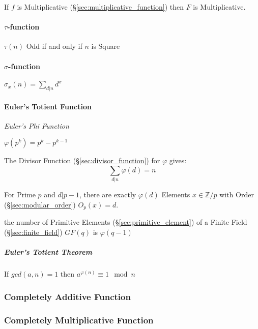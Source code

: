 If $f$ is Multiplicative (\S\ref{sec:multiplicative_function}) then
$F$ is Multiplicative.



\paragraph{$\tau$-function}\label{sec:tau_function}\hfill

$\tau(n)$ Odd if and only if $n$ is Square



\paragraph{$\sigma$-function}\label{sec:sigma_function}\hfill

$\sigma_x(n) = \sum_{d | n} d^x$



\paragraph{Euler's Totient Function}\label{sec:eulers_totient}\hfill

\emph{Euler's Phi Function}

$\varphi(p^k) = p^k - p^{k-1}$

The Divisor Function (\S\ref{sec:divisor_function}) for $\varphi$
gives:
\[
  \sum_{d|n}\varphi(d) = n
\]

For Prime $p$ and $d|p-1$, there are exactly $\varphi(d)$ Elements $x
\in \mathbb{Z}/p$ with Order (\S\ref{sec:modular_order}) $O_p(x) = d$.

the number of Primitive Elements (\S\ref{sec:primitive_element}) of a Finite
Field (\S\ref{sec:finite_field}) $GF(q)$ is $\varphi(q - 1)$



\subparagraph{Euler's Totient Theorem}\label{sec:totient_theorem}\hfill

If $gcd(a,n) = 1$ then $a^{\varphi(n)} \equiv 1 \mod n$



\subsubsection{Completely Additive Function}
\label{sec:completely_additive_function}

\subsubsection{Completely Multiplicative Function}
\label{sec:completely_multiplicative_function}


